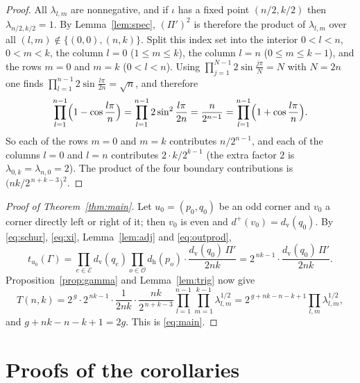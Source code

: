 \documentclass[11pt,a4paper]{amsart}
\theoremstyle{remark}
\newcommand{\G}{\Gamma}
\newcommand{\dout}{d^{+}}
\newcommand{\dvv}{d_{\mathrm v}}
\newcommand{\dhh}{d_{\mathrm h}}
\begin{document}
\begin{proof}
All $\lambda_{l,m}$ are nonnegative, and if $\iota$ has a fixed point $(n/2,k/2)$ then
$\lambda_{n/2,k/2}=1$. By Lemma~\ref{lem:spec}, $(\Pi')^2$ is therefore the product of $\lambda_{l,m}$ over
all $(l,m)\notin\{(0,0),(n,k)\}$. Split this index set into the interior $0<l<n$, $0<m<k$, the column $l=0$
($1\le m\le k$), the column $l=n$ ($0\le m\le k-1$), and the rows $m=0$ and $m=k$ ($0<l<n$). Using
$\prod_{j=1}^{N-1}2\sin\frac{j\pi}{N}=N$ with $N=2n$ one finds $\prod_{l=1}^{n-1}2\sin\frac{l\pi}{2n}=\sqrt n$,
and therefore
\[ \prod_{l=1}^{n-1}\Bigl(1-\cos\frac{l\pi}n\Bigr)=\prod_{l=1}^{n-1}2\sin^2\frac{l\pi}{2n}=\frac{n}{2^{n-1}}
=\prod_{l=1}^{n-1}\Bigl(1+\cos\frac{l\pi}n\Bigr). \]
So each of the rows $m=0$ and $m=k$ contributes $n/2^{n-1}$, and each of the columns $l=0$ and $l=n$ contributes
$2\cdot k/2^{k-1}$ (the extra factor $2$ is $\lambda_{0,k}=\lambda_{n,0}=2$). The product of the four boundary
contributions is $\bigl(nk/2^{\,n+k-3}\bigr)^2$.
\end{proof}

\begin{proof}[Proof of Theorem~\ref{thm:main}]
Let $u_0=(p_0,q_0)$ be an odd corner and $v_0$ a corner directly left or right of it; then $v_0$ is even and
$\dout(v_0)=\dvv(q_0)$. By \eqref{eq:schur}, \eqref{eq:xi}, Lemma~\ref{lem:adj} and \eqref{eq:outprod},
\[
t_{u_0}(\G)=\prod_{e\in\mathcal E}\dvv(q_e)\prod_{o\in\mathcal O}\dhh(p_o)\cdot\frac{\dvv(q_0)\,\Pi'}{2nk}
=2^{\,nk-1}\cdot\frac{\dvv(q_0)\,\Pi'}{2nk}.
\]
Proposition~\ref{prop:gamma} and Lemma~\ref{lem:trig} now give
\[
T(n,k)=2^{\,g}\cdot 2^{\,nk-1}\cdot\frac{1}{2nk}\cdot\frac{nk}{2^{\,n+k-3}}\prod_{l=1}^{n-1}\prod_{m=1}^{k-1}\lambda_{l,m}^{1/2}
=2^{\,g+nk-n-k+1}\prod_{l,m}\lambda_{l,m}^{1/2},
\]
and $g+nk-n-k+1=2g$. This is \eqref{eq:main}.
\end{proof}

\section{Proofs of the corollaries}
\end{document}
